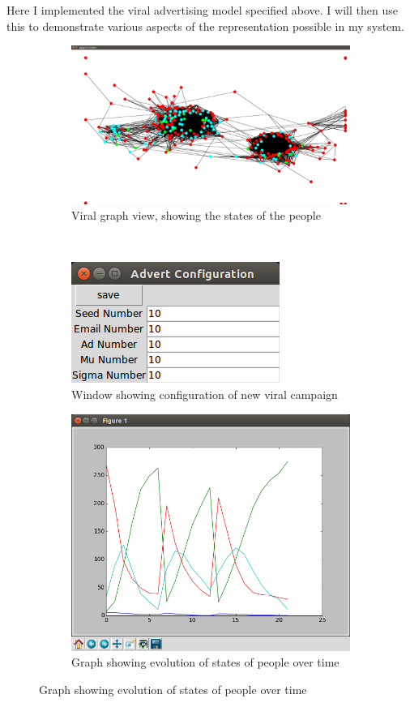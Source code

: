 \documentclass[12pt,a4paper]{article}
\begin{document}
Here I implemented the viral advertising model specified above. I will then use this to demonstrate various aspects of the representation possible in my system.

\begin{figure}[htb]
\centering
\captionsetup[subfigure]{justification=centering}
	\begin{subfigure}[b]{0.3\linewidth}
	\caption{Viral graph view, showing the states of the people}
	\label{fig:viralStates}
	\includegraphics[scale=0.1]{Viral1.png}
	\end{subfigure}
\\
	\begin{subfigure}[b]{0.3\linewidth}
	\caption{Window showing configuration of new viral campaign}
	\label{fig:viralConfig}
	\includegraphics[scale=0.3]{Viral2.png}
	\end{subfigure}
\quad
	\begin{subfigure}[b]{0.3\linewidth}
	\caption{Graph showing evolution of states of people over time}
	\label{fig:viralGraph}
	\includegraphics[scale=0.2]{Viral3.png}

\end{subfigure}
\end{figure}
\end{document}
